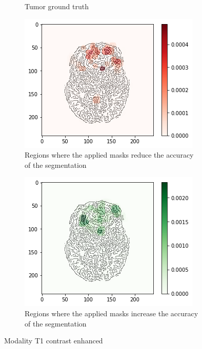 \begin{figure}[H]
\begin{subfigure}[t]{.4\textwidth}
        \caption{Tumor ground truth}
    \end{subfigure}
    \begin{subfigure}[t]{.45\textwidth}
        \centering
        \includegraphics[width=\linewidth]{chapters/06_hdm/c_Brats18_2013_17_1_L1/48.png}
        \caption{Regions where the applied masks reduce the accuracy of the segmentation}
    \end{subfigure}\hspace{1cm}%
    \begin{subfigure}[t]{.45\textwidth}
        \centering
        \includegraphics[width=\linewidth]{chapters/06_hdm/c_Brats18_2013_17_1_L1/49.png}
        \caption{Regions where the applied masks increase the accuracy of the segmentation}
    \end{subfigure}
    \caption{Modality T1 contrast enhanced}
    \label{brats_201317_t1ce}
\end{figure}


